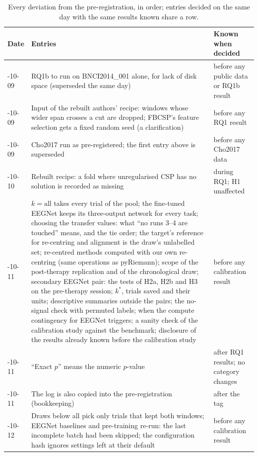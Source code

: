 \begin{table}[!htbp]
\centering
\caption{Every deviation from the pre-registration, in order; entries decided on the same day with the same results known share a row.}
\label{tab:app-deviations}
\footnotesize
\begin{tabularx}{\textwidth}{>{\raggedright\arraybackslash}p{1.65cm}>{\raggedright\arraybackslash}X>{\raggedright\arraybackslash}p{3.6cm}}
\toprule
Date & Entries & Known when decided \\
\midrule
2026-10-09 & RQ1b to run on BNCI2014\_001 alone, for lack of disk space (superseded the same day) & before any public data or RQ1b result \\
2026-10-09 & Input of the rebuilt authors' recipe: windows whose wider span crosses a cut are dropped; FBCSP's feature selection gets a fixed random seed (a clarification) & before any RQ1 result \\
2026-10-09 & Cho2017 run as pre-registered; the first entry above is superseded & before any Cho2017 data \\
2026-10-10 & Rebuilt recipe: a fold where unregularised CSP has no solution is recorded as missing & during RQ1; H1 unaffected \\
2026-10-11 & $k = \text{all}$ takes every trial of the pool; the fine-tuned EEGNet keeps its three-output network for every task; choosing the transfer values: what ``no runs 3--4 are touched'' means, and the tie order; the target's reference for re-centring and alignment is the draw's unlabelled set; re-centred methods computed with our own re-centring (same operations as pyRiemann); scope of the post-therapy replication and of the chronological draw; secondary EEGNet pair: the tests of H2a, H2b and H3 on the pre-therapy session; $k^*$, trials saved and their units; descriptive summaries outside the pairs; the no-signal check with permuted labels; when the compute contingency for EEGNet triggers; a sanity check of the calibration study against the benchmark; disclosure of the results already known before the calibration study & before any calibration result \\
2026-10-11 & ``Exact $p$'' means the numeric $p$-value & after RQ1 results; no category changes \\
2026-10-11 & The log is also copied into the pre-registration (bookkeeping) & after the tag \\
2026-10-12 & Draws below all pick only trials that kept both windows; EEGNet baselines and pre-training re-run: the last incomplete batch had been skipped; the configuration hash ignores settings left at their default & before any calibration result \\

\end{tabularx}
\end{table}
